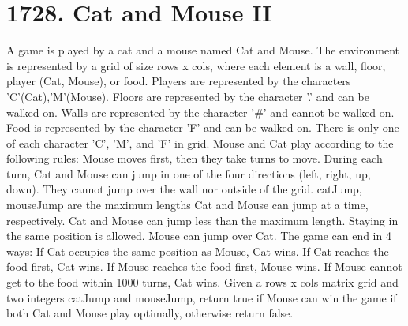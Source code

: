 \documentclass[9pt, b5paaper]{book}
\begin{document}
\section{1728. Cat and Mouse II}
\label{sec-1-20}
A game is played by a cat and a mouse named Cat and Mouse.
The environment is represented by a grid of size rows x cols, where each element is a wall, floor, player (Cat, Mouse), or food.
Players are represented by the characters 'C'(Cat),'M'(Mouse).
Floors are represented by the character '.' and can be walked on.
Walls are represented by the character '\#' and cannot be walked on.
Food is represented by the character 'F' and can be walked on.
There is only one of each character 'C', 'M', and 'F' in grid.
Mouse and Cat play according to the following rules:
Mouse moves first, then they take turns to move.
During each turn, Cat and Mouse can jump in one of the four directions (left, right, up, down). They cannot jump over the wall nor outside of the grid.
catJump, mouseJump are the maximum lengths Cat and Mouse can jump at a time, respectively. Cat and Mouse can jump less than the maximum length.
Staying in the same position is allowed.
Mouse can jump over Cat.
The game can end in 4 ways:
If Cat occupies the same position as Mouse, Cat wins.
If Cat reaches the food first, Cat wins.
If Mouse reaches the food first, Mouse wins.
If Mouse cannot get to the food within 1000 turns, Cat wins.
Given a rows x cols matrix grid and two integers catJump and mouseJump, return true if Mouse can win the game if both Cat and Mouse play optimally, otherwise return false.
\end{document}
